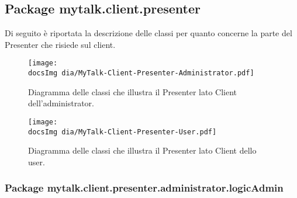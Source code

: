 \subsection{Package mytalk.client.presenter}
\noindent Di seguito è riportata la descrizione delle classi per quanto concerne la parte del Presenter che risiede sul client\g .

	\begin{figure}[h!tbp]
		\centering
		\texttt{[image: \\docsImg dia/MyTalk-Client-Presenter-Administrator.pdf]}
		\caption{Diagramma delle classi che illustra il Presenter lato Client dell'administrator.}
	\end{figure}

\newpage

	\begin{figure}[h!tbp]
		\centering
		\texttt{[image: \\docsImg dia/MyTalk-Client-Presenter-User.pdf]}
		\caption{Diagramma delle classi che illustra il Presenter lato Client dello user.}
	\end{figure}



\subsubsection{Package mytalk.client.presenter.administrator.logicAdmin}
